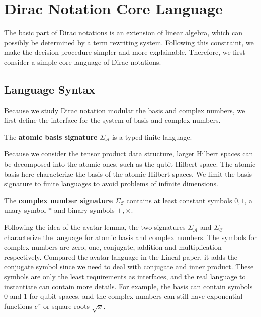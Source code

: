 
\section{Dirac Notation Core Language}

The basic part of Dirac notations is an extension of linear algebra, which can possibly be determined by a term rewriting system. Following this constraint, we make the decision procedure simpler and more explainable. Therefore, we first consider a simple core language of Dirac notations.


\subsection{Language Syntax}

Because we study Dirac notation modular the basis and complex numbers, we first define the interface for the system of basis and complex numbers. 

\begin{definition} 
  The \textbf{atomic basis signature} $\Sigma_\mathcal{A}$ is a  typed finite language.
\end{definition}

Because we consider the tensor product data structure, larger Hilbert spaces can be decomposed into the atomic ones, such as the qubit Hilbert space. The atomic basis here characterize the basis of the atomic Hilbert spaces.
We limit the basis signature to finite languages to avoid problems of infinite dimensions.

\begin{definition} 
  The \textbf{complex number signature} $\Sigma_\mathcal{C}$ contains at least constant symbols $0, 1$, a unary symbol $*$ and binary symbols $+, \times$.
\end{definition}

Following the idea of the avatar lemma, the two signatures $\Sigma_\mathcal{A}$ and $\Sigma_\mathcal{C}$ characterize the language for atomic basis and complex numbers. 
The symbols for complex numbers are zero, one, conjugate, addition and multiplication respectively. Compared the avatar language in the Lineal paper\cite{Arrighi2017}, it adds the conjugate symbol since we need to deal with conjugate and inner product.
These symbols are only the least requirements as interfaces, and the real language to instantiate can contain more details. For example, the basis can contain symbols $0$ and $1$ for qubit spaces, and the complex numbers can still have exponential functions $e^x$ or square roots $\sqrt{x}$.


